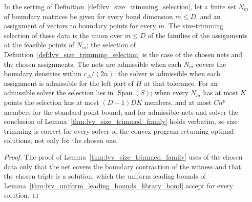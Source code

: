 \begin{lemma}
    \label{thm:lvv_size_trimming_selection_with}
    \leanok
    In the setting of Definition~\ref{def:lvv_size_trimming_selection}, let a
    finite set $N_m$ of boundary matrices be given for every bond dimension
    $m\le D$, and an assignment of vectors to boundary points for every $m$.
    The size-trimming selection of these data is the union over $m\le D$ of the
    families of the assignments at the feasible points of $N_m$; the selection
    of Definition~\ref{def:lvv_size_trimming_selection} is the case of the
    chosen nets and the chosen assignments. The nets are admissible when each
    $N_m$ covers the boundary densities within $c_\Delta/(2n)$; the solver is
    admissible when each assignment is admissible for the left part of $H$ at
    that tolerance. For an admissible solver the selection lies in
    $\operatorname{Span}(S)$; when every $N_m$ has at most $K$ points the
    selection has at most $(D+1)DK$ members, and at most $Cn^{p}$ members for the
    standard point bound; and for admissible nets and solver the conclusion of
    Lemma~\ref{thm:lvv_size_trimmed_family} holds verbatim, so size trimming is
    correct for every solver of the convex program returning optimal solutions,
    not only for the chosen one.
\end{lemma}
\begin{proof}\leanok
    The proof of Lemma~\ref{thm:lvv_size_trimmed_family} uses of the chosen
    data only that the net covers the boundary contraction of the witness and
    that the chosen triple is a solution, which the uniform leading bounds of
    Lemma~\ref{thm:lvv_uniform_leading_bounds_library_bond} accept for every solution.
\end{proof}

